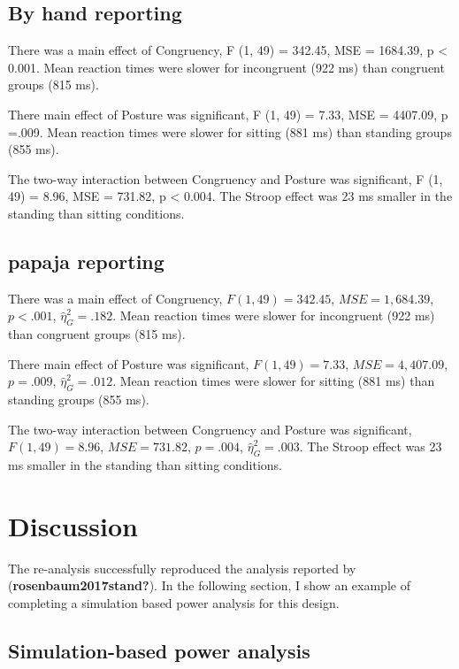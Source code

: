 \documentclass[
  english,
  man]{article}
\begin{document}
\hypertarget{by-hand-reporting}{%
\subsection{By hand reporting}\label{by-hand-reporting}}

There was a main effect of Congruency, F (1, 49) = 342.45, MSE = 1684.39, p \textless{} 0.001. Mean reaction times were slower for incongruent (922 ms) than congruent groups (815 ms).

There main effect of Posture was significant, F (1, 49) = 7.33, MSE = 4407.09, p =.009. Mean reaction times were slower for sitting (881 ms) than standing groups (855 ms).

The two-way interaction between Congruency and Posture was significant, F (1, 49) = 8.96, MSE = 731.82, p \textless{} 0.004. The Stroop effect was 23 ms smaller in the standing than sitting conditions.

\hypertarget{papaja-reporting}{%
\subsection{papaja reporting}\label{papaja-reporting}}

There was a main effect of Congruency, \(F(1, 49) = 342.45\), \(\mathit{MSE} = 1,684.39\), \(p < .001\), \(\hat{\eta}^2_G = .182\). Mean reaction times were slower for incongruent (922 ms) than congruent groups (815 ms).

There main effect of Posture was significant, \(F(1, 49) = 7.33\), \(\mathit{MSE} = 4,407.09\), \(p = .009\), \(\hat{\eta}^2_G = .012\). Mean reaction times were slower for sitting (881 ms) than standing groups (855 ms).

The two-way interaction between Congruency and Posture was significant, \(F(1, 49) = 8.96\), \(\mathit{MSE} = 731.82\), \(p = .004\), \(\hat{\eta}^2_G = .003\). The Stroop effect was 23 ms smaller in the standing than sitting conditions.

\hypertarget{discussion}{%
\section{Discussion}\label{discussion}}

The re-analysis successfully reproduced the analysis reported by (\textbf{rosenbaum2017stand?}). In the following section, I show an example of completing a simulation based power analysis for this design.

\hypertarget{simulation-based-power-analysis}{%
\subsection{Simulation-based power analysis}\label{simulation-based-power-analysis}}
\end{document}
